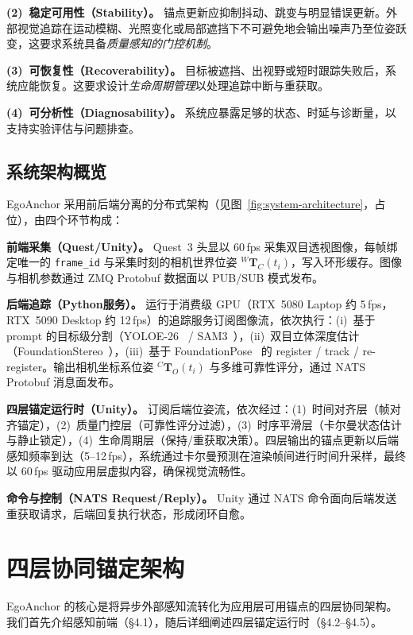 \documentclass[review]{vgtc}
\begin{document}
\noindent\textbf{(2)~稳定可用性（Stability）。} 锚点更新应抑制抖动、跳变与明显错误更新。外部视觉追踪在运动模糊、光照变化或局部遮挡下不可避免地会输出噪声乃至位姿跃变，这要求系统具备\emph{质量感知的门控机制}。

\noindent\textbf{(3)~可恢复性（Recoverability）。} 目标被遮挡、出视野或短时跟踪失败后，系统应能恢复。这要求设计\emph{生命周期管理}以处理追踪中断与重获取。

\noindent\textbf{(4)~可分析性（Diagnosability）。} 系统应暴露足够的状态、时延与诊断量，以支持实验评估与问题排查。

\subsection{系统架构概览}

EgoAnchor 采用前后端分离的分布式架构（见图~\ref{fig:system-architecture}，占位），由四个环节构成：

\noindent\textbf{前端采集（Quest/Unity）。} Quest~3 头显以 60\,fps 采集双目透视图像，每帧绑定唯一的 \texttt{frame\_id} 与采集时刻的相机世界位姿 ${}^{W}\mathbf{T}_{C}(t_i)$，写入环形缓存。图像与相机参数通过 ZMQ Protobuf 数据面以 PUB/SUB 模式发布。

\noindent\textbf{后端追踪（Python服务）。} 运行于消费级 GPU（RTX~5080 Laptop 约 5\,fps，RTX~5090 Desktop 约 12\,fps）的追踪服务订阅图像流，依次执行：(i)~基于 prompt 的目标级分割（YOLOE-26~\cite{yoloe2025} / SAM3~\cite{sam3_2025}），(ii)~双目立体深度估计（FoundationStereo~\cite{foundationstereo2025}），(iii)~基于 FoundationPose~\cite{foundationpose2023} 的 register / track / re-register。输出相机坐标系位姿 ${}^{C}\mathbf{T}_{O}(t_i)$ 与多维可靠性评分，通过 NATS Protobuf 消息面发布。

\noindent\textbf{四层锚定运行时（Unity）。} 订阅后端位姿流，依次经过：(1)~时间对齐层（帧对齐锚定），(2)~质量门控层（可靠性评分过滤），(3)~时序平滑层（卡尔曼状态估计与静止锁定），(4)~生命周期层（保持/重获取决策）。四层输出的锚点更新以后端感知频率到达（5--12\,fps），系统通过卡尔曼预测在渲染帧间进行时间升采样，最终以 60\,fps 驱动应用层虚拟内容，确保视觉流畅性。

\noindent\textbf{命令与控制（NATS Request/Reply）。} Unity 通过 NATS 命令面向后端发送重获取请求，后端回复执行状态，形成闭环自愈。

\section{四层协同锚定架构}

EgoAnchor 的核心是将异步外部感知流转化为应用层可用锚点的四层协同架构。我们首先介绍感知前端（§4.1），随后详细阐述四层锚定运行时（§4.2--§4.5）。
\end{document}
